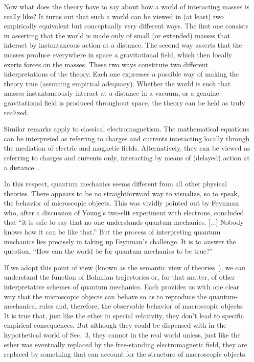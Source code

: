 \documentclass[12pt]{article}
\begin{document}
Now what does the theory have to say about
how a world of interacting masses is really like?
It turns out that such a world can be viewed
in (at least) two empirically equivalent but conceptually
very different ways.  The first one consists in asserting
that the world is made only of small (or extended) masses
that interact by instantaneous action at a distance.
The second way asserts that the masses produce
everywhere in space a gravitational field, which
then locally exerts forces on the masses.  These two ways
constitute two different interpretations of the theory.
Each one expresses a possible way of making the
theory true (assuming empirical adequacy).
Whether the world is such that masses instantaneously
interact at a distance in a vacuum, or a
genuine gravitational field is produced throughout
space, the theory can be held as truly realized.

Similar remarks apply to classical electromagnetism.
The mathematical equations can be interpreted
as referring to charges and currents interacting
locally through the mediation of electric and magnetic
fields.  Alternatively, they can be viewed as referring
to charges and currents only, interacting by
means of (delayed) action at a
distance~\cite{wheeler2}.

In this respect, quantum mechanics seems different
from all other physical theories.  There appears to be
no straightforward way to visualize, so to speak,
the behavior of microscopic objects.  This was vividly pointed
out by Feynman~\cite[p.~129]{feynman} who,
after a discussion of Young's
two-slit experiment with electrons, concluded that
``it is safe to say that no one understands quantum
mechanics.  [...] Nobody knows how it can be like
that.''  But the process of interpreting quantum mechanics
lies precisely in taking up Feynman's challenge.
It is to answer the question, ``How can the world
be for quantum mechanics to be true?''

If we adopt this point of view (known as the
semantic view of theories~\cite{giere,suppe}),
we can understand
the function of Bohmian trajectories or, for that matter, of
other interpretative schemes of quantum mechanics.
Each provides us with one clear way that the microscopic
objects can behave so as to
reproduce the quantum-mechanical rules and,
therefore, the observable behavior of macroscopic
objects.  It is true that, just like the
ether in special relativity, they don't lead to
specific empirical consequences.  But although they
could be dispensed with in the hypothetical world
of Sec.~3, they cannot in the real
world unless, just like the ether was eventually
replaced by the free-standing electromagnetic
field, they are replaced by something that
can account for the structure of macroscopic
objects.
\end{document}
